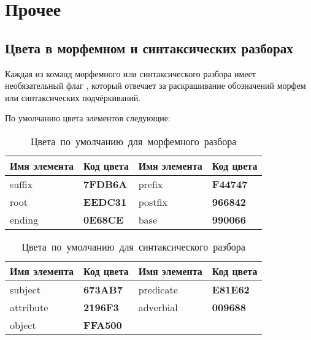 \section{Прочее}

\subsection{Цвета в морфемном и синтаксических разборах}

Каждая из команд морфемного или синтаксического разбора имеет необязательный
флаг \rsKwarg[color], который отвечает за раскрашивание обозначений морфем
или синтаксических подчёркиваний.

По умолчанию цвета элементов следующие:


\renewcommand{\arraystretch}{1.125}
\begin{table}[ht!]
    \centering
    \small
    \begin{tabular}{@{}llll@{}}
        \toprule
        Имя элемента & Код цвета & Имя элемента & Код цвета\\\midrule
suffix & { \color[HTML]{7FDB6A} \textbf{7FDB6A} } & prefix & { \color[HTML]{F44747} \textbf{F44747} }\\\midrule
root & { \color[HTML]{EEDC31} \textbf{EEDC31} } & postfix & { \color[HTML]{966842} \textbf{966842} }\\\midrule
ending & { \color[HTML]{0E68CE} \textbf{0E68CE} } & base & { \color[HTML]{990066} \textbf{990066} }
        \\\bottomrule
    \end{tabular}

    \caption{Цвета~по~умолчанию~для~морфемного~разбора}
\end{table}



\renewcommand{\arraystretch}{1.125}
\begin{table}[ht!]
    \centering
    \small
    \begin{tabular}{@{}llll@{}}
        \toprule
        Имя элемента & Код цвета & Имя элемента & Код цвета\\\midrule
subject & { \color[HTML]{673AB7} \textbf{673AB7} } & predicate & { \color[HTML]{E81E62} \textbf{E81E62} }\\\midrule
attribute & { \color[HTML]{2196F3} \textbf{2196F3} } & adverbial & { \color[HTML]{009688} \textbf{009688} }\\\midrule
object & { \color[HTML]{FFA500} \textbf{FFA500} }
        \\\bottomrule
    \end{tabular}

    \caption{Цвета~по~умолчанию~для~синтаксического~разбора}
\end{table}



